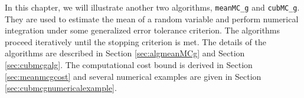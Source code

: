 \documentclass{iitthesis}
\theoremstyle{definition}
\begin{document}
%
%

 \label{chapter:meanMCg}

In this chapter, we will illustrate another two algorithms, {\tt meanMC\_g} and {\tt cubMC\_g}. They are used to estimate the mean of a random variable and perform numerical integration under some generalized error tolerance criterion. The algorithms proceed iteratively until the stopping criterion is met. The details of the algorithms are described in Section \ref{sec:algmeanMCg} and Section \ref{sec:cubmcgalg}. The computational cost bound is derived in Section \ref{sec:meanmcgcost} and several numerical examples are given in Section \ref{sec:cubmcgnumericalexample}.

\label{sec:generalerrorcriterion}
\end{document}
